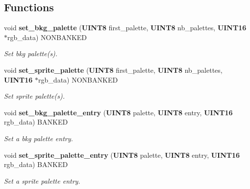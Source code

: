 \subsection*{Functions}
\begin{CompactItemize}
\item 
\label{cgb.h_a21}
void {\bf set\_\-bkg\_\-palette} ({\bf UINT8} first\_\-palette, {\bf UINT8} nb\_\-palettes, {\bf UINT16} $\ast$rgb\_\-data) NONBANKED
\begin{CompactList}\small\item\em Set bkg palette(s).\item\end{CompactList}

\item 
\label{cgb.h_a22}
void {\bf set\_\-sprite\_\-palette} ({\bf UINT8} first\_\-palette, {\bf UINT8} nb\_\-palettes, {\bf UINT16} $\ast$rgb\_\-data) NONBANKED
\begin{CompactList}\small\item\em Set sprite palette(s).\item\end{CompactList}

\item 
\label{cgb.h_a23}
void {\bf set\_\-bkg\_\-palette\_\-entry} ({\bf UINT8} palette, {\bf UINT8} entry, {\bf UINT16} rgb\_\-data) BANKED
\begin{CompactList}\small\item\em Set a bkg palette entry.\item\end{CompactList}

\item 
\label{cgb.h_a24}
void {\bf set\_\-sprite\_\-palette\_\-entry} ({\bf UINT8} palette, {\bf UINT8} entry, {\bf UINT16} rgb\_\-data) BANKED
\begin{CompactList}\small\item\em Set a sprite palette entry.\item\end{CompactList}


\end{CompactItemize}

